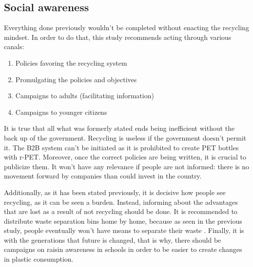\documentclass[twoside,a4paper,12pt]{report}
\begin{document}
\subsection{Social awareness}
Everything done previously wouldn't be completed without enacting the recycling mindset. In order to do that, this study recommends acting through various canals:

\begin{enumerate}
    \item Policies favoring the recycling system
    \item Promulgating the policies and objectives
    \item Campaigns to adults (facilitating information)
    \item Campaigns to younger citizens
\end{enumerate}

It is true that all what was formerly stated ends being inefficient without the back up of the government. Recycling is useless if the government doesn't permit it. The B2B system can't be initiated as it is prohibited to  create PET bottles with r-PET. Moreover, once the correct policies are being written, it is crucial to publicize them. It won't have any relevance if people are not informed: there is no movement forward by companies than could invest in the country.

Additionally, as it has been stated previously, it is decisive how people see recycling, as it can be seen a burden. Instead, informing about the advantages that are lost as a result of not recycling should be done. It is recommended to distribute waste separation bins home by home, because as seen in the previous study, people eventually won't have means to separate their waste \cite{Wen2014}. Finally, it is with the generations that future is changed, that is why, there should be campaigns on raisin awareness in schools in order to be easier to create changes in plastic consumption.
\end{document}
